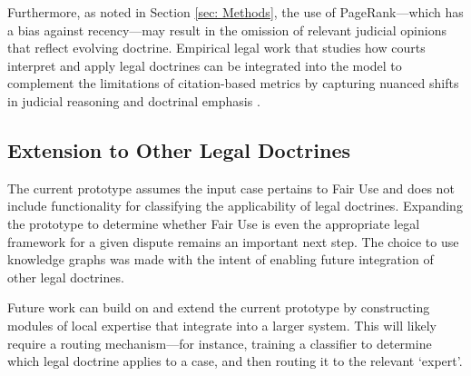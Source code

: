 Furthermore, as noted in Section \ref{sec: Methods}, the use of PageRank—which has a bias against recency—may result in the omission of relevant judicial opinions that reflect evolving doctrine. Empirical legal work that studies how courts interpret and apply legal doctrines can be integrated into the model to complement the limitations of citation-based metrics by capturing nuanced shifts in judicial reasoning and doctrinal emphasis \cite{17_FairUse}.

\subsection{Extension to Other Legal Doctrines}

The current prototype assumes the input case pertains to Fair Use and does not include functionality for classifying the applicability of legal doctrines. Expanding the prototype to determine whether Fair Use is even the appropriate legal framework for a given dispute remains an important next step. The choice to use knowledge graphs was made with the intent of enabling future integration of other legal doctrines.

Future work can build on and extend the current prototype by constructing modules of local expertise that integrate into a larger system. This will likely require a routing mechanism—for instance, training a classifier to determine which legal doctrine applies to a case, and then routing it to the relevant `expert’.